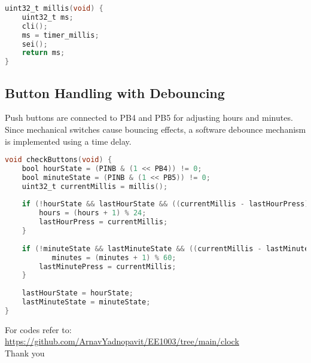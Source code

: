 \documentclass{article}
\begin{document}
\begin{lstlisting}[language=C, caption=Time Keeping]
uint32_t millis(void) {
    uint32_t ms;
    cli();
    ms = timer_millis;
    sei();
    return ms;
}
\end{lstlisting}

\subsection{Button Handling with Debouncing}
Push buttons are connected to PB4 and PB5 for adjusting hours and minutes. Since mechanical switches cause bouncing effects, a software debounce mechanism is implemented using a time delay.

\begin{lstlisting}[language=C, caption=Button Debouncing]
void checkButtons(void) {
    bool hourState = (PINB & (1 << PB4)) != 0;
    bool minuteState = (PINB & (1 << PB5)) != 0;
    uint32_t currentMillis = millis();
    
    if (!hourState && lastHourState && ((currentMillis - lastHourPress) > debounceDelay)) {
        hours = (hours + 1) % 24;
        lastHourPress = currentMillis;
    }
    
    if (!minuteState && lastMinuteState && ((currentMillis - lastMinutePress) > debounceDelay)) {
           minutes = (minutes + 1) % 60;
        lastMinutePress = currentMillis;
    }
    
    lastHourState = hourState;
    lastMinuteState = minuteState;
}
\end{lstlisting}
For codes refer to:\\
\url{https://github.com/ArnavYadnopavit/EE1003/tree/main/clock}\\

\centering
Thank you
\end{document}
